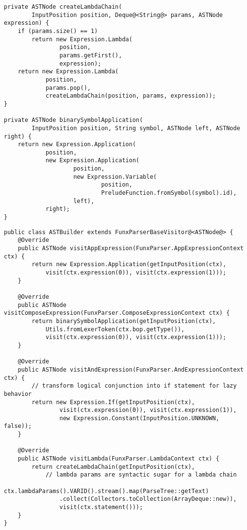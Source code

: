\begin{lstlisting}[caption={Metodi per astrazioni annidate e operatori simbolici binari}, style=javaCode, label={lst:5-auxiliary-methods-java}]
private ASTNode createLambdaChain(
        InputPosition position, Deque@<String@> params, ASTNode expression) {
    if (params.size() == 1)
        return new Expression.Lambda(
                position,
                params.getFirst(),
                expression);
    return new Expression.Lambda(
            position,
            params.pop(),
            createLambdaChain(position, params, expression));
}

private ASTNode binarySymbolApplication(
        InputPosition position, String symbol, ASTNode left, ASTNode right) {
    return new Expression.Application(
            position,
            new Expression.Application(
                    position,
                    new Expression.Variable(
                            position,
                            PreludeFunction.fromSymbol(symbol).id),
                    left),
            right);
}
\end{lstlisting}
\vspace{4mm}
\begin{lstlisting}[caption={Alcuni metodi \textit{visit} di \texttt{ASTBuilder}}, style=javaCode, label={lst:5-astbuilder-java}]
public class ASTBuilder extends FunxParserBaseVisitor@<ASTNode@> {
    @Override
    public ASTNode visitAppExpression(FunxParser.AppExpressionContext ctx) {
        return new Expression.Application(getInputPosition(ctx),
            visit(ctx.expression(0)), visit(ctx.expression(1)));
    }

    @Override
    public ASTNode visitComposeExpression(FunxParser.ComposeExpressionContext ctx) {
        return binarySymbolApplication(getInputPosition(ctx),
            Utils.fromLexerToken(ctx.bop.getType()),
            visit(ctx.expression(0)), visit(ctx.expression(1)));
    }

    @Override
    public ASTNode visitAndExpression(FunxParser.AndExpressionContext ctx) {
        // transform logical conjunction into if statement for lazy behavior
        return new Expression.If(getInputPosition(ctx),
                visit(ctx.expression(0)), visit(ctx.expression(1)),
                new Expression.Constant(InputPosition.UNKNOWN, false));
    }

    @Override
    public ASTNode visitLambda(FunxParser.LambdaContext ctx) {
        return createLambdaChain(getInputPosition(ctx),
            // lambda params are syntactic sugar for a lambda chain
            ctx.lambdaParams().VARID().stream().map(ParseTree::getText)
                .collect(Collectors.toCollection(ArrayDeque::new)),
                visit(ctx.statement()));
    }
}    
\end{lstlisting}